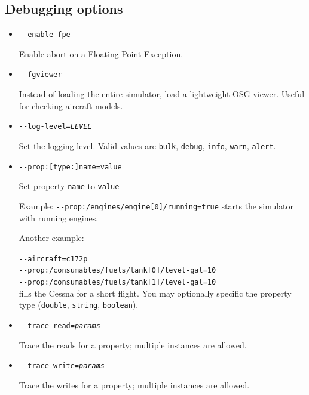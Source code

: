 \subsection{Debugging options}
\begin{itemize}

\item{\texttt{-$ $-enable-fpe}}

Enable abort on a Floating Point Exception. 

\item{\texttt{-$ $-fgviewer}}

Instead of loading the entire simulator, load a lightweight OSG viewer. Useful for checking aircraft
models.

\item{\texttt{-$ $-log-level={\it LEVEL}}}

Set the logging level. Valid values are \texttt{bulk}, \texttt{debug}, \texttt{info}, \texttt{warn}, \texttt{alert}.

\item{\texttt{-$ $-prop:[type:]name=value}}

Set property \texttt{name} to \texttt{value}

Example: \texttt{-$ $-prop:/engines/engine[0]/running=true} starts the simulator with running engines.

Another example:

\texttt{-$ $-aircraft=c172p}\\
\texttt{-$ $-prop:/consumables/fuels/tank[0]/level-gal=10}\\
\texttt{-$ $-prop:/consumables/fuels/tank[1]/level-gal=10}\\

fills the Cessna for a short flight. You may optionally specific
the property type (\texttt{double}, \texttt{string}, \texttt{boolean}).

\item{\texttt{-$ $-trace-read={\it params}}}

Trace the reads for a property; multiple instances are allowed.

\item{\texttt{-$ $-trace-write={\it params}}}

Trace the writes for a property; multiple instances are allowed.
\end{itemize}


